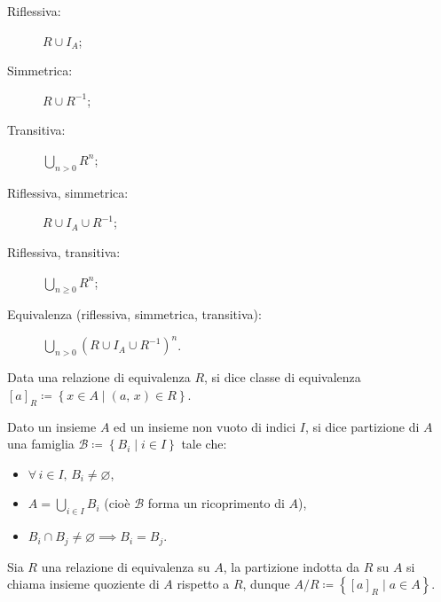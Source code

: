 \documentclass[10pt]{article}
\newcommand{\inv}[1]{{#1}^{-1}}
\renewcommand{\emptyset}{\varnothing}
\begin{document}
        \begin{minipage}[h]{.3\textwidth}
            \begin{description}
                \item[Riflessiva:] \(R \cup I_A\);
                \item[Simmetrica:] \(R \cup \inv{R}\);
                \item[Transitiva:] \(\bigcup_{n > 0} R^n\);
            \end{description} 
        \end{minipage}
        \begin{minipage}[h]{.7\textwidth}
            \begin{description}
                \item[Riflessiva, simmetrica:] \(R \cup I_A \cup \inv{R}\);
                \item[Riflessiva, transitiva:] \(\bigcup_{n \geqslant 0} R^n\);
                \item[Equivalenza (riflessiva, simmetrica, transitiva):] \(\bigcup_{n > 0} {(R \cup I_A \cup \inv{R})}^n\).
            \end{description}
        \end{minipage}

        \medskip

        Data una relazione di equivalenza \(R\), si dice classe di equivalenza
        \([a]_R \coloneqq \left\{x \in A \; | \; (a, \, x) \in R\right\}\).

        Dato un insieme \(A\) ed un insieme non vuoto di indici \(I\), si dice partizione di \(A\) una famiglia
        \(\mathcal{B} \coloneqq \left\{B_i \; | \; i \in I\right\}\) tale che:
        \begin{multicols}{3}
            \begin{itemize}
                \item \(\forall \, i \in I, \, B_i \neq \emptyset\),
                \item \(A = \bigcup_{i \in I} B_i\) (cioè \(\mathcal{B}\) forma un ricoprimento di \(A\)),
                \item \(B_i \cap B_j \neq \emptyset \implies B_i = B_j\).
            \end{itemize}
        \end{multicols}

        Sia \(R\) una relazione di equivalenza su \(A\), la partizione indotta da \(R\) su \(A\) si chiama insieme quoziente
        di \(A\) rispetto a \(R\), dunque \(A/R \coloneqq \left\{[a]_R \; | \; a \in A\right\}\).
\end{document}
